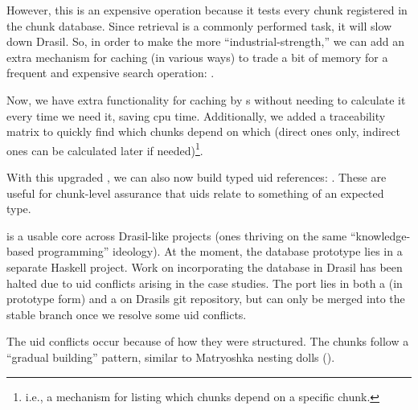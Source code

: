 \pseudoGrabAllChunksFromNewChunkDB{}

However, this is an expensive operation because it tests every chunk registered
in the chunk database. Since retrieval is a commonly performed task, it will
slow down Drasil. So, in order to make the \ChunkDB{} more
``industrial-strength,'' we can add an extra mechanism for caching (in various
ways) to trade a bit of memory for a frequent and expensive search operation:
.

\protoChunkDBHaskell{}

Now, we have extra functionality for caching by \TypeRep{}s without needing to
calculate it every time we need it, saving \acs{cpu} time. Additionally, we
added a traceability matrix to quickly find which chunks depend on which (direct
ones only, indirect ones can be calculated later if needed)\footnote{i.e., a
mechanism for listing which chunks depend on a specific chunk.}.

\protoTypedUIDHaskell{}

With this upgraded \ChunkDB{}, we can also now build typed \acs{uid} references:
. These are useful for chunk-level assurance that
\acsp{uid} relate to something of an expected type.

\ChunkDB{} is a usable core across Drasil-like projects (ones thriving on the
same ``knowledge-based programming'' ideology). At the moment, the database
prototype lies in a separate Haskell project. Work on incorporating the database
in Drasil has been halted due to \acs{uid} conflicts arising in the case
studies. The port lies in both a  (in prototype form) and a
 on Drasils git
repository, but can only be merged into the stable branch once we resolve some
\acs{uid} conflicts.

\matryoshkaDollsImg{}

The \acs{uid} conflicts occur because of how they were structured. The chunks
follow a ``gradual building'' pattern, similar to Matryoshka nesting
dolls ().

\pseudoChunkNestingHaskell{}

